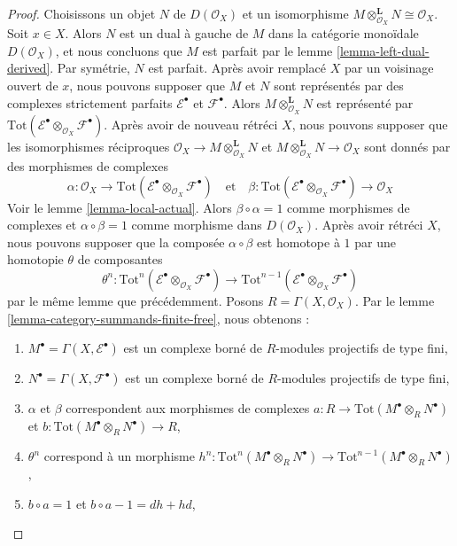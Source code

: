 {\begin{proof}
Choisissons un objet $N$ de $D(\mathcal{O}_X)$
et un isomorphisme
$M \otimes_{\mathcal{O}_X}^\mathbf{L} N \cong \mathcal{O}_X$. Soit $x \in X$. Alors $N$ est un dual à gauche de $M$ dans la catégorie monoïdale
$D(\mathcal{O}_X)$, et nous concluons que $M$ est parfait par le lemme \ref{lemma-left-dual-derived}. Par symétrie,
$N$ est parfait. Après avoir remplacé $X$ par un voisinage ouvert de $x$, nous pouvons supposer que $M$ et $N$ sont représentés par des complexes strictement parfaits $\mathcal{E}^\bullet$ et $\mathcal{F}^\bullet$. Alors $M \otimes_{\mathcal{O}_X}^\mathbf{L} N$ est représenté par
$\text{Tot}(\mathcal{E}^\bullet \otimes_{\mathcal{O}_X} \mathcal{F}^\bullet)$. Après avoir de nouveau rétréci $X$, nous pouvons supposer que les isomorphismes réciproques
$\mathcal{O}_X \to M \otimes_{\mathcal{O}_X}^\mathbf{L} N$ et
$M \otimes_{\mathcal{O}_X}^\mathbf{L} N \to \mathcal{O}_X$
sont donnés par des morphismes de complexes
$$
\alpha : \mathcal{O}_X \to
\text{Tot}(\mathcal{E}^\bullet \otimes_{\mathcal{O}_X} \mathcal{F}^\bullet)
\quad\text{et}\quad
\beta :
\text{Tot}(\mathcal{E}^\bullet \otimes_{\mathcal{O}_X} \mathcal{F}^\bullet)
\to \mathcal{O}_X
$$
Voir le lemme \ref{lemma-local-actual}. Alors $\beta \circ \alpha = 1$
comme morphismes de complexes et $\alpha \circ \beta = 1$ comme morphisme dans $D(\mathcal{O}_X)$. Après avoir rétréci $X$,
nous pouvons supposer que la composée $\alpha \circ \beta$ est homotope à $1$
par une homotopie $\theta$ de composantes
$$
\theta^n :
\text{Tot}^n(\mathcal{E}^\bullet \otimes_{\mathcal{O}_X} \mathcal{F}^\bullet)
\to
\text{Tot}^{n - 1}(
\mathcal{E}^\bullet \otimes_{\mathcal{O}_X} \mathcal{F}^\bullet)
$$
par le même lemme que précédemment. Posons $R = \Gamma(X, \mathcal{O}_X)$. Par le lemme \ref{lemma-category-summands-finite-free},
nous obtenons :

\begin{enumerate}

\item  $M^\bullet = \Gamma(X, \mathcal{E}^\bullet)$ est un complexe borné de $R$-modules projectifs de type fini,
\item  $N^\bullet = \Gamma(X, \mathcal{F}^\bullet)$ est un complexe borné de $R$-modules projectifs de type fini,
\item  $\alpha$ et $\beta$ correspondent aux morphismes de complexes
$a : R \to \text{Tot}(M^\bullet \otimes_R N^\bullet)$ et
$b : \text{Tot}(M^\bullet \otimes_R N^\bullet) \to R$,
\item  $\theta^n$ correspond à un morphisme
$h^n : \text{Tot}^n(M^\bullet \otimes_R N^\bullet) \to
\text{Tot}^{n - 1}(M^\bullet \otimes_R N^\bullet)$,
\item  $b \circ a = 1$ et $b \circ a - 1 = dh + hd$,


\end{enumerate}
\end{proof}}
